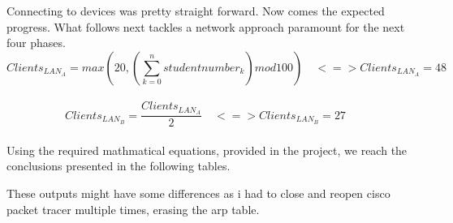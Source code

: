 \documentclass[11pt,a4paper]{report}
\begin{document}
    Connecting to devices was pretty straight forward. Now comes the expected progress. What follows next tackles a network approach paramount for the next four phases.\\
        \[
            Clients_{LAN_A} = max\left(20, \left(\sum_{k=0}^n studentnumber_k\right)mod 100\right)\quad <=> 
            Clients_{LAN_A} = 48\quad
        \] \\
        \[
            Clients_{LAN_B} = \frac{Clients_{LAN_A}}{2}\quad <=>
            Clients_{LAN_B} = 27\quad
        \]\\

    Using the required mathmatical equations, provided in the project, we reach the conclusions presented in the following tables.\\

    \lstset{style=termoutputs}
    
    

    These outputs might have some differences as i had to close and reopen cisco packet tracer multiple times, erasing the arp table.
\end{document}
